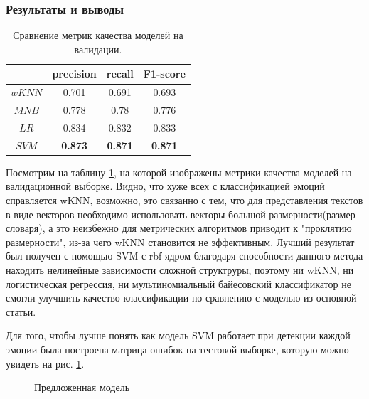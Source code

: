\documentclass{article}
\begin{document}
\subsubsection{Результаты и выводы}
\begin{table}[h!]
\centering
\begin{tabular}{|c|c|c|c|}
	\hline
		& precision & recall & F1-score\\
	\hline
		$wKNN$ & 0.701 &  0.691 & 0.693\\
	\hline
		$MNB$  &  0.778 & 0.78 & 0.776\\
	\hline
		$LR$ & 0.834 &  0.832 & 0.833 \\
	\hline
		$SVM$ & \bfseries{0.873} & \bfseries{0.871} & \bfseries{0.871} \\
	\hline
\end{tabular}
\caption{Сравнение метрик качества моделей на валидации.}
\label{table:table1}
\end{table}
Посмотрим на таблицу \ref{table:table1}, на которой изображены метрики качества моделей на валидационной выборке. Видно, что хуже всех с классификацией эмоций справляется wKNN, возможно, это связанно с тем, что для представления текстов в виде векторов необходимо использовать векторы большой размерности(размер словаря), а это неизбежно для метрических алгоритмов приводит к "проклятию размерности"{}, из-за чего wKNN становится не эффективным. Лучший результат был получен с помощью SVM с rbf-ядром благодаря способности данного метода находить нелинейные зависимости сложной структруры, поэтому ни wKNN, ни логистическая регрессия, ни мультиномиальный байесовский классификатор не смогли улучшить качество классификации по сравнению с моделью из основной статьи.

Для того, чтобы лучше понять как  модель SVM работает при детекции каждой эмоции была построена матрица ошибок на тестовой выборке, которую можно увидеть на рис. \ref{eq:conf_matr1}.
\begin{figure}[h]
    \caption{\centering Предложенная модель}
	\label{eq:conf_matr1}
\end{figure}
\end{document}
